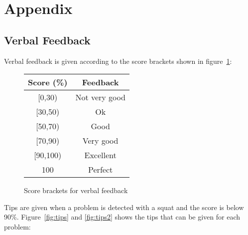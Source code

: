 \section{Appendix}

\subsection{Verbal Feedback}
\label{sec:appendix_feedback}

Verbal feedback is given according to the score brackets shown in figure~\ref{fig:score_brackets}:

\begin{figure}[H]
    \centering
	\begin{tabular}{ | c | c | }
		\hline
	    \textbf{Score (\%)} & \textbf{Feedback}\\ \hline
	    [0,30) & Not very good \\ \hline
		[30,50) & Ok \\ \hline
		[50,70) & Good \\ \hline
		[70,90) & Very good \\ \hline
		[90,100) & Excellent \\ \hline
		100 & Perfect \\ \hline
	\end{tabular}
\caption{Score brackets for verbal feedback}
\label{fig:score_brackets}
\end{figure}

Tips are given when a problem is detected with a squat and the score is below 90\%. Figure~\ref{fig:tips} and \ref{fig:tips2} shows the tips that can be given for each problem:

